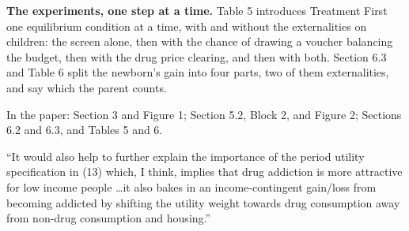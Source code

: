 \documentclass[11pt]{article}
\begin{document}
\begin{response}
\textbf{The experiments, one step at a time.} Table 5 introduces Treatment First one
equilibrium condition at a time, with and without the externalities on children: the
screen alone, then with the chance of drawing a voucher balancing the budget, then with the
drug price clearing, and then with both. Section 6.3 and Table 6 split the newborn's gain
into four parts, two of them externalities, and say which the parent counts.

In the paper: Section 3 and Figure 1; Section 5.2, Block 2, and Figure 2; Sections 6.2
and 6.3, and Tables 5 and 6.
\end{response}

\begin{referee}
``It would also help to further explain the importance of the period utility
specification in (13) which, I think, implies that drug addiction is more
attractive for low income people \dots it also bakes in an income-contingent
gain/loss from becoming addicted by shifting the utility weight towards drug
consumption away from non-drug consumption and housing.''
\end{referee}
\end{document}
